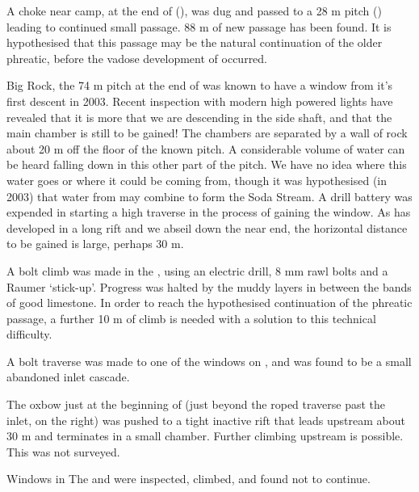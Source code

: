 A choke near camp, at the end of  (), was dug and passed to a 28 m pitch ()
leading to continued small passage. 88 m of new passage has been found.
It is hypothesised that this passage may be the natural continuation of
the older  phreatic, before the vadose
development of  occurred.

Big Rock, the 74 m pitch at the end of  was
known to have a window from it's first descent in 2003. Recent
inspection with modern high powered lights have revealed that it is more
that we are descending in the side shaft, and that the main chamber is
still to be gained! The chambers are separated by a wall of rock about
20 m off the floor of the known pitch. A considerable volume of water
can be heard falling down in this other part of the pitch. We have no
idea where this water goes or where it could be coming from, though it
was hypothesised (in 2003) that water from  may combine to form the Soda Stream. A drill battery was
expended in starting a high traverse in the process of gaining the
window. As  has developed in a long rift
and we abseil down the near end, the horizontal distance to be gained is
large, perhaps 30 m.

A bolt climb was made in the , using an
electric drill, 8 mm rawl bolts and a Raumer `stick-up'. Progress was
halted by the muddy layers in between the bands of good limestone. In
order to reach the hypothesised continuation of the phreatic passage, a
further 10 m of climb is needed with a solution to this technical
difficulty.

A bolt traverse was made to one of the windows on , and
was found to be a small abandoned inlet cascade.

The oxbow just at the beginning of  (just
beyond the roped traverse past the inlet, on the right) was pushed to a
tight inactive rift that leads upstream about 30 m and terminates in a
small chamber. Further climbing upstream is possible. This was not
surveyed.

Windows in The  and  were inspected,
climbed, and found not to continue.

